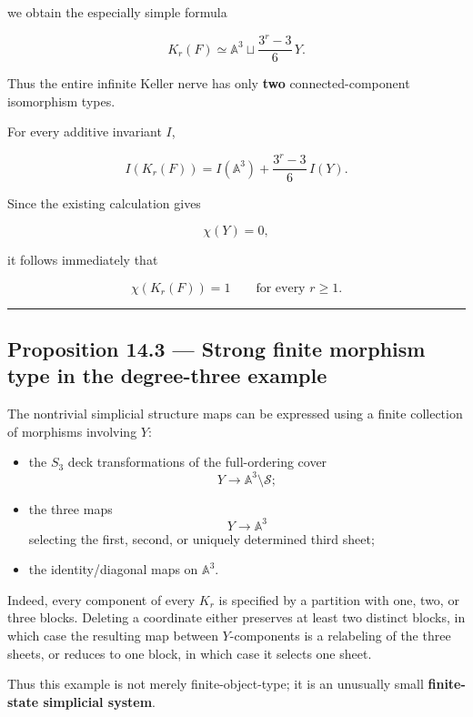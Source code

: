 we obtain the especially simple formula

\[
\boxed{
K_r(F)
\simeq
\mathbb A^3
\sqcup
\frac{3^r-3}{6}\,Y.
}
\]

Thus the entire infinite Keller nerve has only \textbf{two}
connected-component isomorphism types.

For every additive invariant \(I\),

\[
\boxed{
I(K_r(F))
=
I(\mathbb A^3)
+
\frac{3^r-3}{6}\,I(Y).
}
\]

Since the existing calculation gives

\[
\chi(Y)=0,
\]

it follows immediately that

\[
\boxed{
\chi(K_r(F))=1
\qquad\text{for every }r\ge1.
}
\]

\begin{center}\rule{0.5\linewidth}{0.5pt}\end{center}

\subsection{Proposition 14.3 --- Strong finite morphism type in the
degree-three
example}\label{proposition-14.3-strong-finite-morphism-type-in-the-degree-three-example}

The nontrivial simplicial structure maps can be expressed using a finite
collection of morphisms involving \(Y\):

\begin{itemize}
\tightlist
\item
  the \(S_3\) deck transformations of the full-ordering cover \[
  Y\to\mathbb A^3\setminus\mathcal S;
  \]
\item
  the three maps \[
  Y\to\mathbb A^3
  \] selecting the first, second, or uniquely determined third sheet;
\item
  the identity/diagonal maps on \(\mathbb A^3\).
\end{itemize}

Indeed, every component of every \(K_r\) is specified by a partition
with one, two, or three blocks. Deleting a coordinate either preserves
at least two distinct blocks, in which case the resulting map between
\(Y\)-components is a relabeling of the three sheets, or reduces to one
block, in which case it selects one sheet.

Thus this example is not merely finite-object-type; it is an unusually
small \textbf{finite-state simplicial system}.

